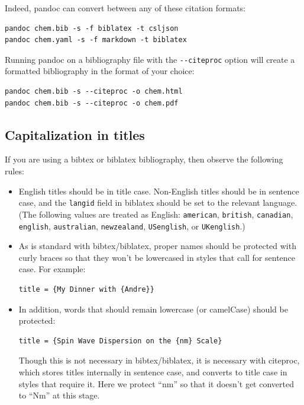 \documentclass[
  b5paper
]{book}
\begin{document}
Indeed, pandoc can convert between any of these citation formats:

\begin{verbatim}
pandoc chem.bib -s -f biblatex -t csljson
pandoc chem.yaml -s -f markdown -t biblatex
\end{verbatim}

Running pandoc on a bibliography file with the \texttt{-\/-citeproc}
option will create a formatted bibliography in the format of your
choice:

\begin{verbatim}
pandoc chem.bib -s --citeproc -o chem.html
pandoc chem.bib -s --citeproc -o chem.pdf
\end{verbatim}

\subsection{Capitalization in titles}\label{capitalization-in-titles}

If you are using a bibtex or biblatex bibliography, then observe the
following rules:

\begin{itemize}
\item
  English titles should be in title case. Non-English titles should be
  in sentence case, and the \texttt{langid} field in biblatex should be
  set to the relevant language. (The following values are treated as
  English: \texttt{american}, \texttt{british}, \texttt{canadian},
  \texttt{english}, \texttt{australian}, \texttt{newzealand},
  \texttt{USenglish}, or \texttt{UKenglish}.)
\item
  As is standard with bibtex/biblatex, proper names should be protected
  with curly braces so that they won't be lowercased in styles that call
  for sentence case. For example:

\begin{verbatim}
title = {My Dinner with {Andre}}
\end{verbatim}
\item
  In addition, words that should remain lowercase (or camelCase) should
  be protected:

\begin{verbatim}
title = {Spin Wave Dispersion on the {nm} Scale}
\end{verbatim}

  Though this is not necessary in bibtex/biblatex, it is necessary with
  citeproc, which stores titles internally in sentence case, and
  converts to title case in styles that require it. Here we protect
  ``nm'' so that it doesn't get converted to ``Nm'' at this stage.
\end{itemize}
\end{document}
